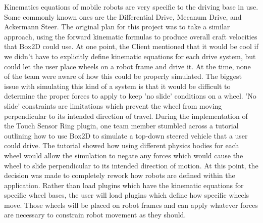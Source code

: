 	Kinematics equations of mobile robots are very specific to the driving base in use. Some commonly known ones are the Differential Drive, Mecanum Drive, and Ackermann Steer.
	The original plan for this project was to take a similar approach, using the forward kinematic formulas to produce overall craft velocities that Box2D could use. At one point, the Client mentioned that it would be cool if we didn't have to explicitly define kinematic equations for each drive system, but could let the user place wheels on a robot frame and drive it. At the time, none of the team were aware of how this could be properly simulated. The biggest issue with simulating this kind of a system is that it would be difficult to determine the proper forces to apply to keep 'no slide' conditions on a wheel. 'No slide' constraints are limitations which prevent the wheel from moving perpendicular to its intended direction of travel.
	During the implementation of the Touch Sensor Ring plugin, one team member stumbled across a tutorial outlining how to use Box2D to simulate a top-down steered vehicle that a user could drive. The tutorial showed how using different physics bodies for each wheel would allow the simulation to negate any forces which would cause the wheel to slide perpendicular to its intended direction of motion. 
	At this point, the decision was made to completely rework how robots are defined within the application. Rather than load plugins which have the kinematic equations for specific wheel bases, the user will load plugins which define how specific wheels move. Those wheels will be placed on robot frames and can apply whatever forces are necessary to constrain robot movement as they should.
	
